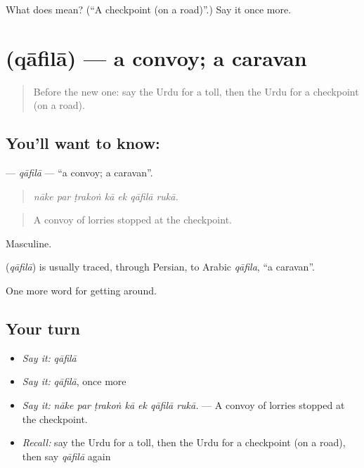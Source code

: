 \begin{tcolorbox}[breakable,colback=teal!4,colframe=teal!35!black,title={Before you move on}]
What does  mean? (\textquotedblleft{}A checkpoint (on a road)\textquotedblright{}.) Say it once more.
\end{tcolorbox}
\section[\texorpdfstring{\ur{قافلہ} (qāfilā)}{قافلہ (qāfilā)}]{ (qāfilā) — a convoy; a caravan}

\label{lesson:UR-C396-qafila}



\begin{quote}
Before the new one: say the Urdu for a toll, then the Urdu for a checkpoint (on a road).
\end{quote}

\subsection*{You'll want to know: }
\textbf{} — \emph{qāfilā} — \textquotedblleft{}a convoy; a caravan\textquotedblright{}.

\begin{quote}
      
\end{quote}

\begin{quote}
\emph{nāke par ṭrakoṅ kā ek qāfilā rukā.}
\end{quote}

\begin{quote}
A convoy of lorries stopped at the checkpoint.
\end{quote}

Masculine.

\begin{cousinweb}
\textbf{} (\emph{qāfilā}) is usually traced, through Persian, to Arabic \emph{qāfila}, \textquotedblleft{}a caravan\textquotedblright{}.
\end{cousinweb}

\begin{grammarlens}[title={What you've built}]
One more word for getting around.
\end{grammarlens}

\subsection*{Your turn}
\begin{itemize}
\raggedright
  \item \emph{Say it:} \emph{qāfilā}
  \item \emph{Say it:} \emph{qāfilā}, once more
  \item \emph{Say it:} \emph{nāke par ṭrakoṅ kā ek qāfilā rukā.} — A convoy of lorries stopped at the checkpoint.
  \item \emph{Recall:} say the Urdu for a toll, then the Urdu for a checkpoint (on a road), then say \emph{qāfilā} again
\end{itemize}

